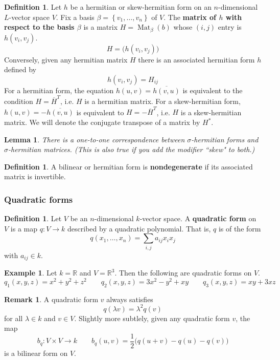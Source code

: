 \documentclass[12pt]{article}
\newtheorem{lemma}[theorem]{Lemma}
\theoremstyle{definition}
\newtheorem{definition}[theorem]{Definition}
\newtheorem{example}[theorem]{Example}
\newtheorem{remark}[theorem]{Remark}
\numberwithin{theorem}{subsection}
\newcommand{\R}{\mathbb{R}}
\newcommand{\sig}{\sigma}
\newcommand{\lam}{\lambda}
\newcommand{\lb}{\left\{}
\newcommand{\rb}{\right\}}
\newcommand{\tbf}{\textbf}
\newcommand{\ov}{\overline}
\DeclareMathOperator{\Mat}{Mat}
\begin{document}
\begin{definition}
Let $h$ be a hermitian or skew-hermitian form on an $n$-dimensional $L$-vector space $V$. Fix a basis $\beta = \lb v_1, \ldots, v_n \rb$ of $V$. The \tbf{matrix of $h$ with respect to the basis $\beta$} is a matrix $H = \Mat_\beta(b)$ whose $(i,j)$ entry is $h(v_i, v_j)$.
\[
	H = \big( h(v_i, v_j) \big)
\]
Conversely, given any hermitian matrix $H$ there is an associated hermitian form $h$ defined by
\[
	h(v_i, v_j) = H_{ij}
\]
For a hermitian form, the equation $h(u,v) = \ov{h(v,u)}$ is equivalent to the condition $H = \ov H^T$, i.e. $H$ is a hermitian matrix. For a skew-hermitian form, $h(u,v) = - \ov{h(v,u)}$ is equivalent to $H = - \ov H^T$, i.e. $H$ is a skew-hermitian matrix. We will denote the conjugate transpose of a matrix by $H^*$. 
\end{definition}

\begin{lemma}
There is a one-to-one correspondence between $\sig$-hermitian forms and $\sig$-hermitian matrices. (This is also true if you add the modifier ``skew" to both.)
\end{lemma}

\begin{definition}
A bilinear or hermitian form is \tbf{nondegenerate} if its associated matrix is invertible.
\end{definition}

\subsubsection{Quadratic forms}

\begin{definition}
Let $V$ be an $n$-dimensional $k$-vector space. A \tbf{quadratic form} on $V$ is a map $q:V \to k$ described by a quadratic polynomial. That is, $q$ is of the form
\[
	q( x_1, \ldots, x_n) = \sum_{i,j} a_{ij} x_i x_j
\]
with $a_{ij} \in k$.
\end{definition}

\begin{example}
Let $k = \R$ and $V = \R^3$. Then the following are quadratic forms on $V$.
\[
	q_1(x,y,z) = x^2+y^2+z^2 \qquad q_2(x,y,z) = 3x^2 - y^2 + xy \qquad q_3(x,y,z) = xy + 3xz 
\]
\end{example}

\begin{remark}
A quadratic form $v$ always satisfies
\[
	q( \lam v) = \lam^2 q(v)
\]
for all $\lam \in k$ and $v \in V$. Slightly more subtlely, given any quadratic form $v$, the map
\[
	b_q:V \times V \to k \qquad b_q(u,v) = \frac 12 \Big( q(u+v) - q(u) - q(v) \Big)
\]
is a bilinear form on $V$.
\end{remark}
\end{document}
